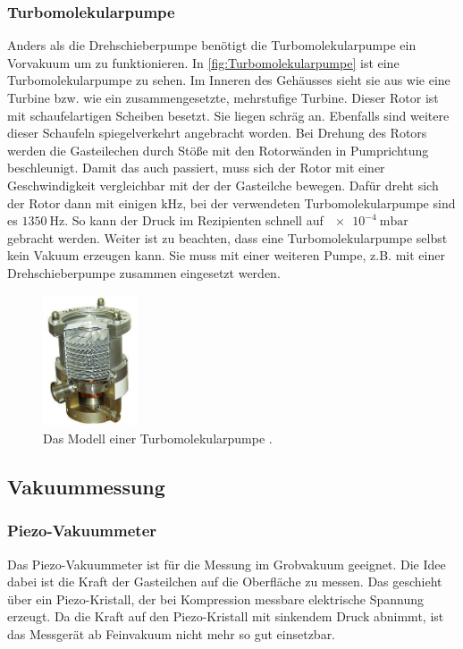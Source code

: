         \subsubsection{Turbomolekularpumpe}
            Anders als die Drehschieberpumpe benötigt die Turbomolekularpumpe ein Vorvakuum um zu funktionieren.
            In \autoref{fig:Turbomolekularpumpe} ist eine Turbomolekularpumpe zu sehen.
            Im Inneren des Gehäusses sieht sie aus wie eine Turbine bzw. wie ein zusammengesetzte, mehrstufige Turbine.
            Dieser Rotor ist mit schaufelartigen Scheiben besetzt.
            Sie liegen schräg an.
            Ebenfalls sind weitere dieser Schaufeln spiegelverkehrt angebracht worden.
            Bei Drehung des Rotors werden die Gasteilechen durch Stöße mit den Rotorwänden in Pumprichtung beschleunigt.
            Damit das auch passiert, muss sich der Rotor mit einer Geschwindigkeit vergleichbar mit der der Gasteilche bewegen.
            Dafür dreht sich der Rotor dann mit einigen $\si{\kilo\hertz}$, bei der verwendeten Turbomolekularpumpe sind es $\SI{1350}{\hertz}$.
            So kann der Druck im Rezipienten schnell auf $\SI{e-4}{\milli\bar}$ gebracht werden.
            Weiter ist zu beachten, dass eine Turbomolekularpumpe selbst kein Vakuum erzeugen kann. 
            Sie muss mit einer weiteren Pumpe, z.B. mit einer Drehschieberpumpe zusammen eingesetzt werden.

        \begin{figure}[H]
            \centering
            \includegraphics[width=0.25\textwidth]{bilder/Turbomolekularpumpe}
            \caption{Das Modell einer Turbomolekularpumpe \cite{turboBild}.}
            \label{fig:Turbomolekularpumpe}
        \end{figure}

    \subsection{Vakuummessung}
        \subsubsection{Piezo-Vakuummeter}
            Das Piezo-Vakuummeter ist für die Messung im Grobvakuum geeignet.
            Die Idee dabei ist die Kraft der Gasteilchen auf die Oberfläche zu messen.
            Das geschieht über ein Piezo-Kristall, der bei Kompression messbare elektrische Spannung erzeugt.
            Da die Kraft auf den Piezo-Kristall mit sinkendem Druck abnimmt, ist das Messgerät ab Feinvakuum nicht mehr so gut einsetzbar.


